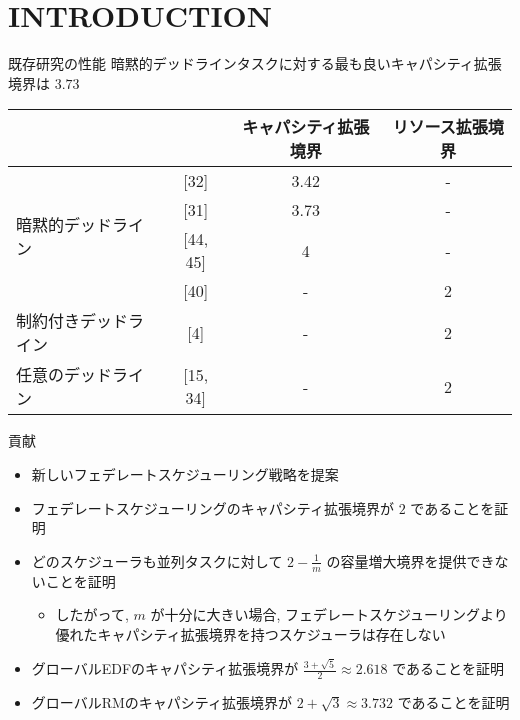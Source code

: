 
\section{INTRODUCTION}
\label{sec: introduction}

\begin{frame}{既存研究の性能}
    暗黙的デッドラインタスクに対する最も良いキャパシティ拡張境界は $3.73$
    \begin{table}[]
        \begin{tabular}{|l|c|c|c|}
            \hline
                                                & \multicolumn{1}{l|}{} & キャパシティ拡張境界 & リソース拡張境界 \\ \hline
            \multirow{4}{*}{暗黙的デッドライン} & {[}32{]}              & 3.42                 & -                \\ \cline{2-4}
                                                & {[}31{]}              & 3.73                 & -                \\ \cline{2-4}
                                                & {[}44, 45{]}          & 4                    & -                \\ \cline{2-4}
                                                & {[}40{]}              & -                    & 2                \\ \hline
            制約付きデッドライン                & {[}4{]}               & -                    & 2                \\ \hline
            任意のデッドライン                  & {[}15, 34{]}          & -                    & 2                \\ \hline
        \end{tabular}
    \end{table}
\end{frame}

\begin{frame}{貢献}
    \begin{itemize}
        \item 新しいフェデレートスケジューリング戦略を提案
        \item フェデレートスケジューリングのキャパシティ拡張境界が $2$ であることを証明
        \item どのスケジューラも並列タスクに対して $2 - \frac{1}{m}$ の容量増大境界を提供できないことを証明
        \begin{itemize}
            \item したがって, $m$ が十分に大きい場合, フェデレートスケジューリングより優れたキャパシティ拡張境界を持つスケジューラは存在しない
        \end{itemize}
        \item グローバルEDFのキャパシティ拡張境界が $\frac{3+\sqrt{5}}{2} \approx 2.618$ であることを証明
        \item グローバルRMのキャパシティ拡張境界が $2+\sqrt{3} \approx 3.732$ であることを証明
    \end{itemize}
\end{frame}
